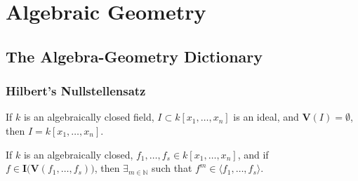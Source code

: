 \documentclass[crop=false,class=article,oneside]{standalone}
\begin{document}
    \ifx\ifsub\undefined
        \section*{Algebraic Geometry}
        \setcounter{section}{1}
    \fi
    \subsection{The Algebra-Geometry Dictionary}
        \subsubsection{Hilbert's Nullstellensatz}
            \begin{theorem}
                If $k$ is an algebraically closed field,
                $I\subset k[x_1,\hdots ,x_n]$ is an ideal,
                and $\mathbf{V}(I)=\emptyset$,
                then $I=k[x_1,\hdots ,x_n]$.
            \end{theorem}
            \begin{theorem}
                If $k$ is an algebraically closed,
                $f_{1},\hdots,f_{s}\in k[x_{1},\hdots,x_{n}]$,
                and if
                $f\in\textbf{I}\big(\mathbf{V}(f_1,\hdots,f_s)\big)$,
                then $\exists_{m\in\mathbb{N}}$ such that
                $f^m \in \langle f_1,\hdots, f_s \rangle$.
            \end{theorem}
\end{document}

